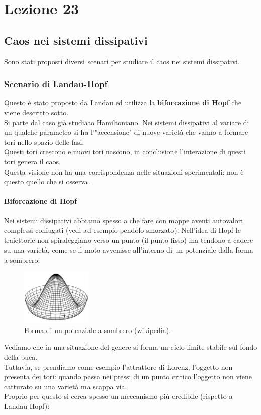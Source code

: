\section{Lezione 23}%
\label{sub:Lezione 23}
\subsection{Caos nei sistemi dissipativi}%
\label{sub:Caos nei sistemi dissipativi}
Sono stati proposti diversi scenari per studiare il caos nei sistemi dissipativi.
\subsubsection{Scenario di Landau-Hopf}%
\label{subsub:Scenario di Landau-Hopf}
Questo è stato proposto da Landau ed utilizza la \textbf{biforcazione di Hopf} che viene descritto sotto.\\
Si parte dal caso già studiato Hamiltoniano. Nei sistemi dissipativi al variare di un qualche parametro si ha l'"accensione" di nuove varietà che vanno a formare tori nello spazio delle fasi.\\ 
Questi tori crescono e nuovi tori nascono, in conclusione l'interazione di questi tori genera il caos. \\
Questa visione non ha una corrispondenza nelle situazioni sperimentali: non è questo quello che si osserva.
\paragraph{Biforcazione di Hopf}%
\label{par:Biforcazione di Hopf}
Nei sistemi dissipativi abbiamo spesso a che fare con mappe aventi autovalori complessi coniugati (vedi ad esempio pendolo smorzato). Nell'idea di Hopf le traiettorie non spiraleggiano verso un punto (il punto fisso) ma tendono a cadere su una varietà, come se il moto avvenisse all'interno di un potenziale dalla forma a sombrero. 
\begin{figure}[H]
    \centering
    \includegraphics[width=0.3\textwidth]{figures/sombrero.png}
    \caption{\scriptsize Forma di un potenziale a sombrero (wikipedia).}
    \label{fig:figures-sombrero-png}
\end{figure}
\noindent
Vediamo che in una situazione del genere si forma un ciclo limite stabile sul fondo della buca.\\
Tuttavia, se prendiamo come esempio l'attrattore di Lorenz, l'oggetto non presenta dei tori: quando passa nei pressi di un punto critico l'oggetto non viene catturato su una varietà ma scappa via.\\
Proprio per questo si cerca spesso un meccanismo più credibile (rispetto a Landau-Hopf): 
